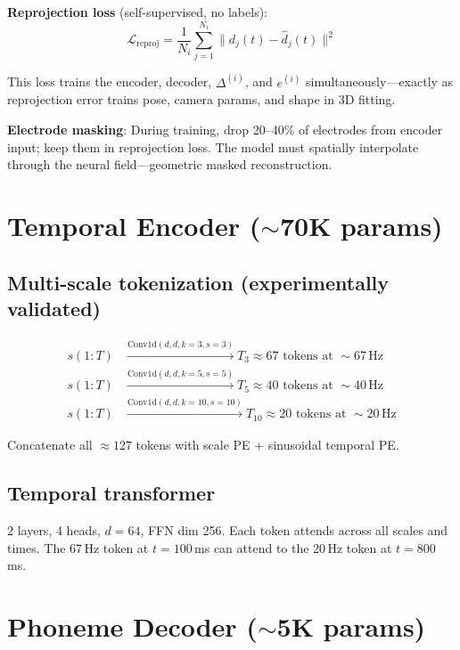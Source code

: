 \documentclass[11pt,letterpaper]{article}
\begin{document}
\textbf{Reprojection loss} (self-supervised, no labels):
\begin{equation}\label{eq:reproj}
\mathcal{L}_{\text{reproj}} = \frac{1}{N_i} \sum_{j=1}^{N_i} \bigl\| d_j(t) - \hat{d}_j(t) \bigr\|^2
\end{equation}

This loss trains the encoder, decoder, $\Delta^{(i)}$, and $e^{(i)}$ simultaneously---exactly as reprojection error trains pose, camera params, and shape in 3D fitting.

\textbf{Electrode masking}: During training, drop 20--40\% of electrodes from encoder input; keep them in reprojection loss. The model must spatially interpolate through the neural field---geometric masked reconstruction.


\section{Temporal Encoder (${\sim}$70K params)}

\subsection{Multi-scale tokenization (experimentally validated)}

\begin{equation}
\begin{aligned}
s(1{:}T) &\xrightarrow{\text{Conv1d}(d,d,k{=}3,s{=}3)} T_3 \approx 67 \text{ tokens at } {\sim}67\,\text{Hz}\\
s(1{:}T) &\xrightarrow{\text{Conv1d}(d,d,k{=}5,s{=}5)} T_5 \approx 40 \text{ tokens at } {\sim}40\,\text{Hz}\\
s(1{:}T) &\xrightarrow{\text{Conv1d}(d,d,k{=}10,s{=}10)} T_{10} \approx 20 \text{ tokens at } {\sim}20\,\text{Hz}
\end{aligned}
\end{equation}

Concatenate all ${\approx}127$ tokens with scale PE + sinusoidal temporal PE.

\subsection{Temporal transformer}

2 layers, 4 heads, $d{=}64$, FFN dim 256. Each token attends across all scales and times. The 67\,Hz token at $t{=}100$\,ms can attend to the 20\,Hz token at $t{=}800$\,ms.


\section{Phoneme Decoder (${\sim}$5K params)}
\end{document}
